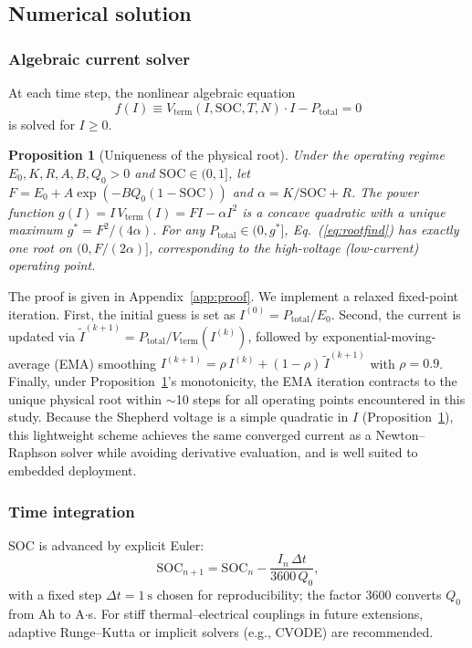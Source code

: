 \documentclass[5p,times,number]{elsarticle}
\newcommand{\appref}[1]{\hyperref[#1]{\textup{Appendix~\ref*{#1}}}}
\newcommand{\eqnref}[1]{\hyperref[#1]{\textup{Eq.~(\ref*{#1})}}}
\newtheorem{proposition}{Proposition}
\def\appref#1{Appendix~\ref{#1}}
\def\eqnref#1{Eq.~(\ref{#1})}
\begin{document}
\subsection{Numerical solution}\label{sec:numerics}
\subsubsection{Algebraic current solver}
At each time step, the nonlinear algebraic equation
\begin{equation}\label{eq:rootfind}
f(I) \equiv V_{\mathrm{term}}(I, \mathrm{SOC}, T, N) \cdot I - P_{\mathrm{total}} = 0
\end{equation}
is solved for $I \ge 0$.
\begin{proposition}[Uniqueness of the physical root]\label{prop:mono}
Under the operating regime $E_0, K, R, A, B, Q_0 > 0$ and $\mathrm{SOC} \in (0, 1]$, let $F = E_0 + A\exp(-BQ_0(1-\mathrm{SOC}))$ and $\alpha = K/\mathrm{SOC} + R$.
The power function $g(I) = I\,V_{\mathrm{term}}(I) = FI - \alpha I^2$ is a concave quadratic with a unique maximum $g^* = F^2/(4\alpha)$.
For any $P_{\mathrm{total}} \in (0, g^*]$, \eqnref{eq:rootfind} has exactly one root on $(0, F/(2\alpha)]$, corresponding to the high-voltage (low-current) operating point.
\end{proposition}
The proof is given in \appref{app:proof}.
We implement a relaxed fixed-point iteration.
First, the initial guess is set as $I^{(0)} = P_{\mathrm{total}}/E_0$.
Second, the current is updated via $\tilde{I}^{(k+1)} = P_{\mathrm{total}} / V_{\mathrm{term}}(I^{(k)})$, followed by exponential-moving-average (EMA) smoothing $I^{(k+1)} = \rho\, I^{(k)} + (1-\rho)\,\tilde{I}^{(k+1)}$ with $\rho = 0.9$.
Finally, under Proposition~\ref{prop:mono}'s monotonicity, the EMA iteration contracts to the unique physical root within $\sim$10 steps for all operating points encountered in this study.
Because the Shepherd voltage is a simple quadratic in $I$ (Proposition~\ref{prop:mono}), this lightweight scheme achieves the same converged current as a Newton--Raphson solver while avoiding derivative evaluation, and is well suited to embedded deployment.

\subsubsection{Time integration}
SOC is advanced by explicit Euler:
\begin{equation}
\mathrm{SOC}_{n+1} = \mathrm{SOC}_n - \frac{I_n\,\Delta t}{3600\,Q_0},
\end{equation}
with a fixed step $\Delta t = \SI{1}{\second}$ chosen for reproducibility; the factor 3600 converts $Q_0$ from Ah to A$\cdot$s.
For stiff thermal--electrical couplings in future extensions, adaptive Runge--Kutta or implicit solvers (e.g., CVODE) are recommended.
\end{document}
